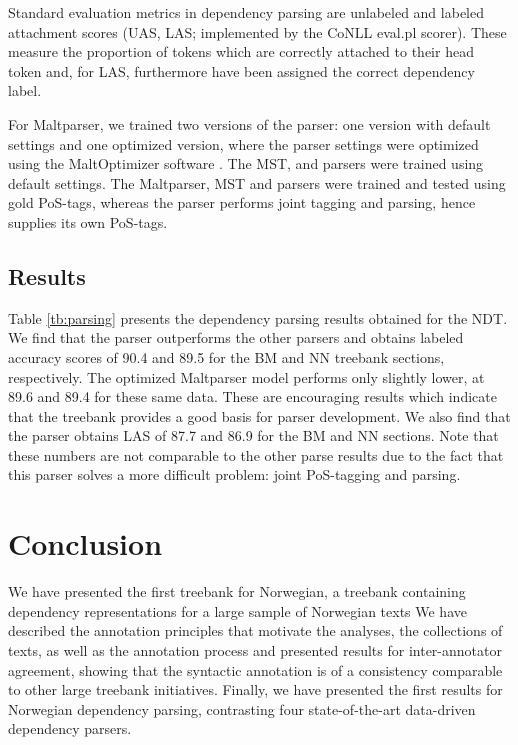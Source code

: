\documentclass[10pt,a4paper]{article}
\begin{document}
Standard evaluation metrics in dependency parsing are unlabeled and
labeled attachment scores (UAS, LAS; implemented by the CoNLL
\textsf{eval.pl} scorer). These measure the proportion of tokens
which are correctly attached to their head token and, for LAS,
furthermore have been assigned the correct dependency label.

For Maltparser, we trained two versions of the
parser: one version with default settings and one optimized version,
where the parser settings were optimized using the MaltOptimizer
software \cite{Bal:Niv:12}. The MST,  and  
parsers were trained using default settings.
The Maltparser, MST and  parsers were trained and tested using gold PoS-tags, whereas the  parser performs joint tagging and parsing, hence supplies its own PoS-tags.


\subsection{Results}
Table \ref{tb:parsing} presents the dependency parsing results
obtained for the NDT. We find that the  parser
outperforms the other parsers and obtains labeled accuracy scores of
90.4 and 89.5 for the BM and NN treebank sections, respectively.  The
optimized Maltparser model performs only slightly lower, at 89.6 and
89.4 for these same data.  These are encouraging results which
indicate that the treebank provides a good basis for parser
development. We also find that the  parser obtains
LAS of 87.7 and 86.9 for the BM and NN sections. Note that these
numbers are not comparable to the other parse results due to the fact
that this parser solves a more difficult problem: joint PoS-tagging
and parsing.

\section{Conclusion}
We have presented the first treebank for Norwegian, a treebank
containing dependency representations for a large sample of Norwegian
texts
We have described the
annotation principles that motivate the analyses, the collections of
texts, as well as the annotation process and presented results for
inter-annotator agreement, showing that the syntactic annotation is of
a consistency comparable to other large treebank initiatives. Finally,
we have presented the first results for Norwegian dependency parsing,
contrasting four state-of-the-art data-driven dependency parsers.
\end{document}
